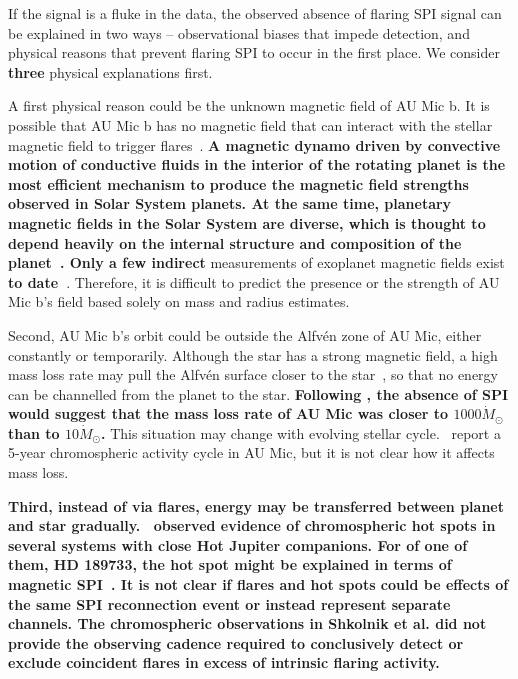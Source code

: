\documentclass[fleqn,usenatbib]{mnras}%
\begin{document}
If the signal is a fluke in the data, the observed absence of flaring SPI signal can be explained in two ways -- observational biases that impede detection, and physical reasons that prevent flaring SPI to occur in the first place. We consider \textbf{three} physical explanations first.

A first physical reason could be the unknown magnetic field of AU Mic b. It is possible that AU Mic b has no magnetic field that can interact with the stellar magnetic field to trigger flares~\citep{lanza2018close-by}. \textbf{A magnetic dynamo driven by convective motion of conductive fluids in the interior of the rotating planet is the most efficient mechanism to produce the magnetic field strengths observed in Solar System planets. At the same time, planetary magnetic fields in the Solar System are diverse, which is thought to depend heavily on the internal structure and composition of the planet~\citep{stevenson2003planetary, jones2011planetary}. Only a few indirect} measurements of exoplanet magnetic fields exist \textbf{to date~\citep[e.g.][]{cauley2019magnetic, ben-jaffel2021signatures}}. Therefore, it is difficult to predict the presence or the strength of AU Mic b's field based solely on mass and radius estimates.

Second, AU Mic b's orbit could be outside the Alfv\'en zone of AU Mic, either constantly or temporarily. Although the star has a strong magnetic field, a high mass loss rate may pull the Alfv\'en surface closer to the star~\citep{kavanagh2021}, so that no energy can be channelled from the planet to the star. \textbf{Following \citet{kavanagh2021}, the absence of SPI would suggest that the mass loss rate of AU Mic was closer to $1000\dot{M}_\odot$ than to $10\dot{M}_\odot$.} This situation may change with evolving stellar cycle.~\citet{ibanezbustos2019first} report a 5-year chromospheric activity cycle in AU Mic, but it is not clear how it affects mass loss.

\textbf{Third, instead of via flares, energy may be transferred between planet and star gradually.~\citet{shkolnik2003evidence, shkolnik2005hot, shkolnik2008nature} observed evidence of chromospheric hot spots in several systems with close Hot Jupiter companions. For of one of them, HD 189733, the hot spot might be explained in terms of magnetic SPI~\citep{cohen2011dynamics,lanza2012starplanet}. It is not clear if flares and hot spots could be effects of the same SPI reconnection event or instead represent separate channels. The chromospheric observations in Shkolnik et al. did not provide the observing cadence required to conclusively detect or exclude coincident flares in excess of intrinsic flaring activity.}
\end{document}
